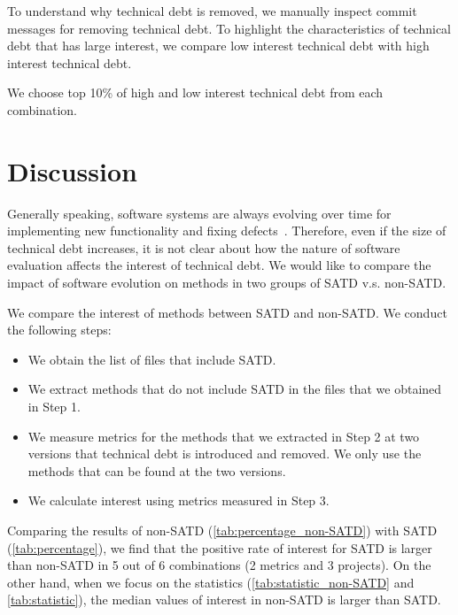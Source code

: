 To understand why technical debt is removed, we manually inspect commit messages for removing technical debt. To highlight the characteristics of technical debt that has large interest, we compare low interest technical debt with high interest technical debt.

We choose top 10\% of high and low interest technical debt from each combination.





\section{Discussion}

Generally speaking, software systems are always evolving over time for implementing new functionality and fixing defects~\cite{xxx}.
Therefore, even if the size of technical debt increases, it is not clear about how the nature of software evaluation affects the interest of technical debt.
We would like to compare the impact of software evolution on methods in two groups of SATD v.s. non-SATD.

We compare the interest of methods between SATD and non-SATD.
We conduct the following steps:
\begin{itemize}
\item We obtain the list of files that include SATD. %
\item We extract methods that do not include SATD in the files that we obtained in Step 1. %
\item We measure metrics for the methods that we extracted in Step 2 at two versions that technical debt is introduced and removed. We only use the methods that can be found at the two versions.
\item We calculate interest using metrics measured in Step 3.
\end{itemize}

Comparing the results of non-SATD (\ref{tab:percentage_non-SATD}) with SATD (\ref{tab:percentage}), we find that the positive rate of interest for SATD is larger than non-SATD in 5 out of 6 combinations (2 metrics and 3 projects). On the other hand, when we focus on the statistics (\ref{tab:statistic_non-SATD} and \ref{tab:statistic}), the median values of interest in non-SATD is larger than SATD.



